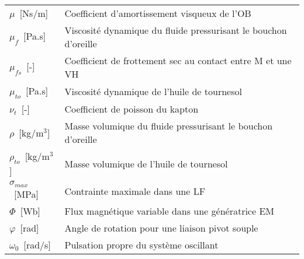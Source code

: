 \begin{table}
{\begin{tabular}{l m{12cm}}
$\mu$~[Ns/m]         & Coefficient d'amortissement visqueux de l'OB     \\
$\mu_f$~[Pa.s]       & Viscosité dynamique du fluide pressurisant le bouchon d'oreille     \\
$\mu_{fs}$~[-]    & Coefficient de frottement sec au contact entre M et une VH         \\
$\mu_{to}$~[Pa.s]      & Viscosité dynamique de l'huile de tournesol \\   \cline{1-1}
$\nu_t$~[-]    & Coefficient de poisson du kapton \\  \cline{1-1}
$\rho$~[kg/m$^3$]    & Masse volumique du fluide pressurisant le bouchon d'oreille     \\
$\rho_{to}$~[kg/m$^3$] & Masse volumique de l'huile de tournesol \\   \cline{1-1}
$\sigma_{max}$~[MPa] & Contrainte maximale dans une LF     \\  \cline{1-1}
$\Phi$~[Wb]          & Flux magnétique variable dans une génératrice EM  \\
$\varphi$~[rad]      & Angle de rotation pour une liaison pivot souple   \\  \cline{1-1}
$\omega_0$~[rad/s] & Pulsation propre du système oscillant \\ 
\bottomrule
\end{tabular}}
\end{table}